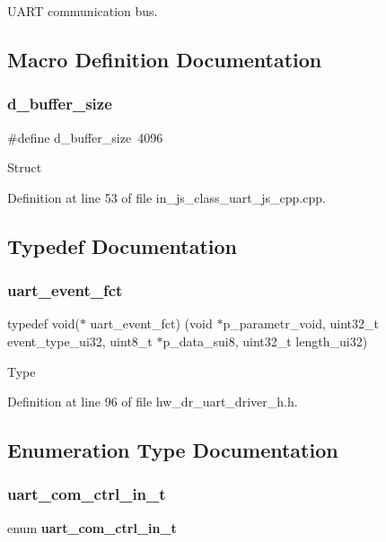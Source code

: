 U\+A\+RT communication bus.

\subsection{Macro Definition Documentation}
\mbox{\label{group___u_a_r_t_ga8c96cc9b53c76c39830354bb412ff059}} 
\subsubsection{d\_buffer\_size}
{\footnotesize\ttfamily \#define d\+\_\+buffer\+\_\+size~4096}

Struct 

Definition at line 53 of file in\+\_\+js\+\_\+class\+\_\+uart\+\_\+js\+\_\+cpp.\+cpp.



\subsection{Typedef Documentation}
\mbox{\label{group___u_a_r_t_ga8f6a90ddf5e09014f2707f38c5f8ff28}} 
\subsubsection{uart\_event\_fct}
{\footnotesize\ttfamily typedef void($\ast$ uart\+\_\+event\+\_\+fct) (void $\ast$p\+\_\+parametr\+\_\+void, uint32\+\_\+t event\+\_\+type\+\_\+ui32, uint8\+\_\+t $\ast$p\+\_\+data\+\_\+sui8, uint32\+\_\+t length\+\_\+ui32)}

Type 

Definition at line 96 of file hw\+\_\+dr\+\_\+uart\+\_\+driver\+\_\+h.\+h.



\subsection{Enumeration Type Documentation}
\mbox{\label{group___u_a_r_t_gab7285632f807ad04f00f44a206440a18}} 
\subsubsection{uart\_com\_ctrl\_in\_t}
{\footnotesize\ttfamily enum \textbf{ uart\+\_\+com\+\_\+ctrl\+\_\+in\+\_\+t}}


